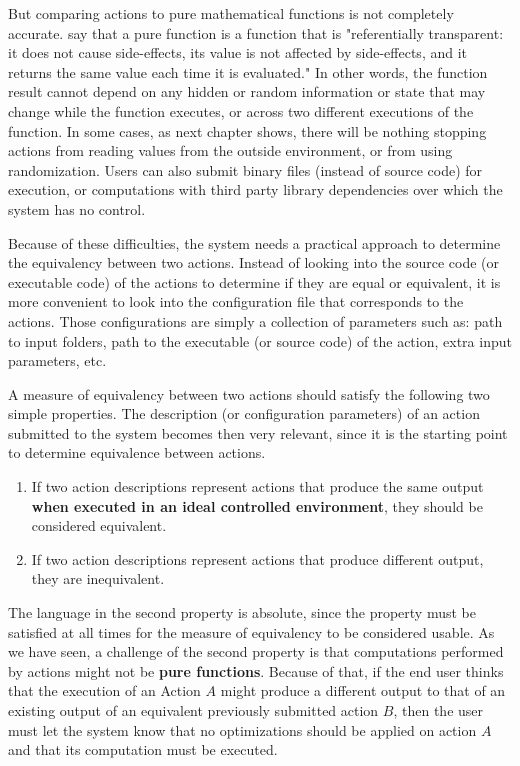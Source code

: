 But comparing actions to pure mathematical functions is not completely accurate.  \cite{gifford1986integrating} say that a pure function is a function that is "referentially transparent: it does not cause side-effects, its value is not affected by side-effects, and it returns the same value each time it is evaluated." In other words, the function result cannot depend on any hidden or random information or state that may change while the function executes, or across two different executions of the function. In some cases, as next chapter shows, there will be nothing stopping actions from reading values from the outside environment, or from using randomization. Users can also submit binary files (instead of source code) for execution, or computations with third party library dependencies over which the system has no control.

Because of these difficulties, the system needs a practical approach to determine the equivalency between two actions.  Instead of looking into the source code (or executable code) of the actions to determine if they are equal or equivalent, it is more convenient to look into the configuration file that corresponds to the actions. Those configurations are simply a collection of parameters such as: path to input folders, path to the executable (or source code) of the action, extra input parameters, etc. 

A measure of equivalency between two actions should satisfy the following two simple properties. The description (or configuration parameters) of an action submitted to the system becomes then very relevant, since it is the starting point to determine equivalence between actions. 

\begin{enumerate}
\item If two action descriptions represent actions that produce the same output \textbf{when executed in an ideal controlled environment}, they should be considered equivalent.
\item If two action descriptions represent actions that produce different output, they are inequivalent.
\end{enumerate}

The language in the second property is absolute, since the property must be satisfied at all times for the measure of equivalency to be considered usable.  As we have seen, a challenge of the second property is that computations performed by actions might not be \textbf{pure functions}.  Because of that, if the end user thinks that the execution of an Action $A$  might produce a different output to that of an existing output of an equivalent previously submitted action $B$, then the user must let the system know that no optimizations should be applied on action $A$ and that its computation must be executed. 

